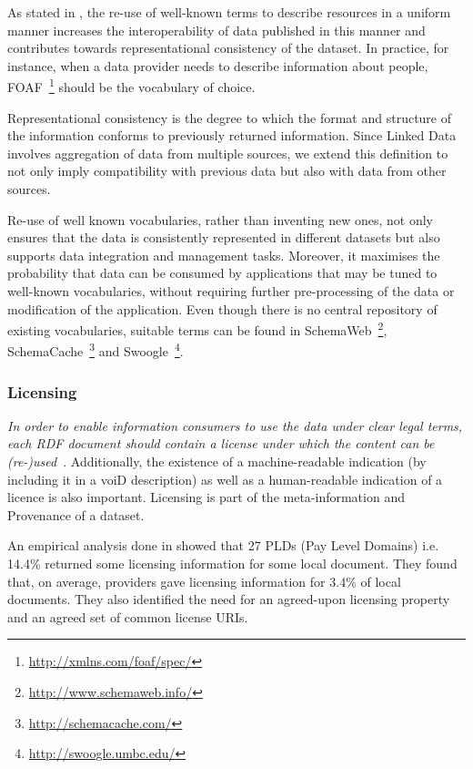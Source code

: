 As stated in \cite{Hogan:2012}, the re-use of well-known terms to describe resources in a uniform manner increases the interoperability of data published in this manner and contributes towards representational consistency of the dataset.
In practice, for instance, when a data provider needs to describe information about people, FOAF~\footnote{\url{http://xmlns.com/foaf/spec/}} should be the vocabulary of choice.

\begin{definition}
Representational consistency is the degree to which the format and structure of the information conforms to previously returned information. 
Since Linked Data involves aggregation of data from multiple sources, we extend this definition to not only imply compatibility with previous data but also with data from other sources. 
\end{definition}

Re-use of well known vocabularies, rather than inventing new ones,  not only ensures that the data is consistently represented in different datasets but also supports data integration and management tasks. 
Moreover, it maximises the probability that data can be consumed by applications that may be tuned to well-known vocabularies, without requiring further pre-processing of the data or modification of the application.
Even though there is no central repository of existing vocabularies, suitable terms can be found in SchemaWeb~\footnote{\url{http://www.schemaweb.info/}}, SchemaCache~\footnote{\url{http://schemacache.com/}} and Swoogle~\footnote{\url{http://swoogle.umbc.edu/}}.

\subsubsection{Licensing}
\emph{In order to enable information consumers to use the data under clear legal terms, each RDF document should contain a license under which the content can be (re-)used}~\cite{Hogan:2012, Flemming}.
Additionally, the existence of a machine-readable indication (by including it in a voiD description) as well as a human-readable indication of a licence is also important.
Licensing is part of the meta-information and Provenance of a dataset.

An empirical analysis done in \cite{Hogan:2012} showed that 27 PLDs (Pay Level Domains) i.e. 14.4\% returned some licensing information for some local document.
They found that, on average, providers gave licensing information for 3.4\% of local documents.
They also identified the need for an agreed-upon licensing property and an agreed set of common license URIs.

